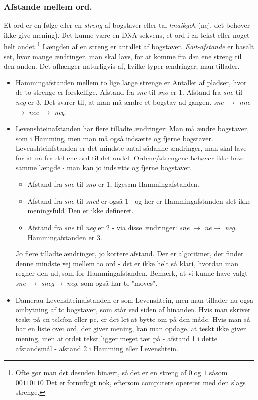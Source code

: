 \documentclass[a4paper, 12pt]{article}
\theoremstyle{remark}
\begin{document}
\subsubsection*{Afstande mellem ord.} 
 
Et ord er en følge eller en \emph{streng} af bogstaver eller tal \emph{hnaikgoh} (nej, det behøver ikke give mening). Det kunne være en DNA-sekvens, et ord i en tekst eller noget helt andet \footnote{Ofte gør man det desuden binært, så det er en streng af $0$ og $1$ såsom $00110110$ Det er fornuftigt nok, eftersom computere opererer med den slags strenge.}
 Længden af en streng er antallet af bogstaver.
\emph{Edit-afstande} er basalt set, hvor mange ændringer, man skal lave, for at komme fra den ene streng til den anden. Det afhænger naturligvis af, hvilke typer ændringer, man tillader. 
\begin{itemize}
\item Hammingafstanden mellem to lige lange strenge er Antallet af pladser, hvor de to strenge er forskellige. 
Afstand fra \emph{sne} til \emph{sno} er $1$. Afstand fra \emph{sne} til \emph{neg} er $3$. 
Det svarer til, at man må ændre et bogstav ad gangen. \emph{sne} $\rightarrow$ \emph{nne} $\rightarrow$ \emph{nee} $\rightarrow$ \emph{neg}.
\item Levenshteinafstanden har flere tilladte ændringer:  
Man må ændre bogstaver, som i Hamming, men man må også indsætte og fjerne bogstaver. 
Levenshteinfstanden er det mindste antal sådanne ændringer, man skal  lave for at nå fra det ene ord til det andet. 
Ordene/strengene behøver ikke have samme længde - man kan jo indsætte og fjerne bogstaver. 
\begin{itemize}
\item Afstand fra  \emph{sne} til \emph{sno} er $1$, ligesom Hammingafstanden. 
\item Afstand fra \emph{sne} til \emph{sned} er også $1$ - og her er Hammingafstanden slet ikke meningsfuld. Den er ikke defineret.
\item Afstand fra \emph{sne} til \emph{neg} er $2$ - via disse ændringer: \emph{sne} $\rightarrow$ \emph{ne}$\rightarrow$ \emph{neg}. Hammingafstanden er 3. 
\end{itemize}
Jo flere tilladte ændringer, jo kortere afstand. Der er algoritmer, der finder denne mindste vej mellem to ord - det er ikke helt så klart, hvordan man regner den ud, som for Hammingafstanden.
 Bemærk, at vi kunne have valgt \emph{sne} $\rightarrow$ \emph{sneg}$\rightarrow$ \emph{neg}, som også har to "moves". 
\item Damerau-Levenshteinafstanden er som Levenshtein, men man tillader nu også ombytning af to bogstaver, som står ved siden af hinanden. 
Hvis man skriver teskt på en telefon eller pc, er det let at bytte om på den måde. 
Hvis man så har en liste over ord, der giver mening, kan man opdage, at teskt ikke giver mening, men at ordet tekst ligger meget tæt på - afstand 1 i dette afstandsmål - afstand 2 i Hamming eller Levenshtein.
\end{itemize}
\end{document}
